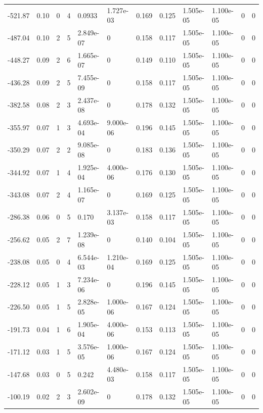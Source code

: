\documentclass[preview]{standalone}
\begin{document}
{{\begin{tabular}{L{1.2cm}C{1.2cm} C{0.3cm}C{0.5cm} C{1.4cm}C{1.4cm} C{1.4cm}C{1.4cm} C{1.6cm}C{1.6cm} C{1.6cm}C{1.6cm}}
  -521.87  &  0.10  & 0     &  4 &  0.0933  & 1.727e-03  &  0.169&   0.125& 1.505e-05 & 1.100e-05   &  0 & 0  \\ 
  -487.04  &  0.10  & 2     &  5 &  2.849e-07  & 0  &  0.158&   0.117& 1.505e-05 & 1.100e-05   &  0 & 0  \\ 
  -448.27  &  0.09  & 2     &  6 &  1.665e-07  & 0  &  0.149&   0.110& 1.505e-05 & 1.100e-05   &  0 & 0  \\ 
  -436.28  &  0.09  & 2     &  5 &  7.455e-09  & 0  &  0.158&   0.117& 1.505e-05 & 1.100e-05   &  0 & 0  \\ 
  -382.58  &  0.08  & 2     &  3 &  2.437e-08  & 0  &  0.178&   0.132& 1.505e-05 & 1.100e-05   &  0 & 0  \\ 
  -355.97  &  0.07  & 1     &  3 &  4.693e-04  & 9.000e-06  &  0.196&   0.145& 1.505e-05 & 1.100e-05   &  0 & 0  \\ 
  -350.29  &  0.07  & 2     &  2 &  9.085e-08  & 0  &  0.183&   0.136& 1.505e-05 & 1.100e-05   &  0 & 0  \\ 
  -344.92  &  0.07  & 1     &  4 &  1.925e-04  & 4.000e-06  &  0.176&   0.130& 1.505e-05 & 1.100e-05   &  0 & 0  \\ 
  -343.08  &  0.07  & 2     &  4 &  1.165e-07  & 0  &  0.169&   0.125& 1.505e-05 & 1.100e-05   &  0 & 0  \\ 
  -286.38  &  0.06  & 0     &  5 &  0.170  & 3.137e-03  &  0.158&   0.117& 1.505e-05 & 1.100e-05   &  0 & 0  \\ 
  -256.62  &  0.05  & 2     &  7 &  1.239e-08  & 0  &  0.140&   0.104& 1.505e-05 & 1.100e-05   &  0 & 0  \\ 
  -238.08  &  0.05  & 0     &  4 &  6.544e-03  & 1.210e-04  &  0.169&   0.125& 1.505e-05 & 1.100e-05   &  0 & 0  \\ 
  -228.12  &  0.05  & 1     &  3 &  7.234e-06  & 0  &  0.196&   0.145& 1.505e-05 & 1.100e-05   &  0 & 0  \\ 
  -226.50  &  0.05  & 1     &  5 &  2.828e-05  & 1.000e-06  &  0.167&   0.124& 1.505e-05 & 1.100e-05   &  0 & 0  \\ 
  -191.73  &  0.04  & 1     &  6 &  1.905e-04  & 4.000e-06  &  0.153&   0.113& 1.505e-05 & 1.100e-05   &  0 & 0  \\ 
  -171.12  &  0.03  & 1     &  5 &  3.576e-05  & 1.000e-06  &  0.167&   0.124& 1.505e-05 & 1.100e-05   &  0 & 0  \\ 
  -147.68  &  0.03  & 0     &  5 &  0.242  & 4.480e-03  &  0.158&   0.117& 1.505e-05 & 1.100e-05   &  0 & 0  \\ 
  -100.19  &  0.02  & 2     &  3 &  2.602e-09  & 0  &  0.178&   0.132& 1.505e-05 & 1.100e-05   &  0 & 0  \\ 

\end{tabular}}}
\end{document}

